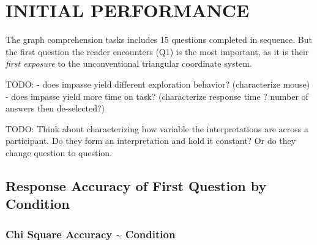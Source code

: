 \documentclass[
  letterpaper,
  DIV=11,
  numbers=noendperiod]{scrreprt}
\begin{document}
\hypertarget{initial-performance}{%
\section{INITIAL PERFORMANCE}\label{initial-performance}}

The graph comprehension tasks includes 15 questions completed in
sequence. But the first question the reader encounters (Q1) is the most
important, as it is their \emph{first exposure} to the unconventional
triangular coordinate system.

TODO: - does impasse yield different exploration behavior? (characterize
mouse) - does impasse yield more time on task? (characterize response
time ? number of answers then de-selected?)

TODO: Think about characterizing how variable the interpretations are
across a participant. Do they form an interpretation and hold it
constant? Or do they change question to question.

\hypertarget{response-accuracy-of-first-question-by-condition}{%
\subsection{Response Accuracy of First Question by
Condition}\label{response-accuracy-of-first-question-by-condition}}

\hypertarget{chi-square-accuracy-condition}{%
\subsubsection{Chi Square \textbar{} Accuracy \textasciitilde{}
Condition}\label{chi-square-accuracy-condition}}
\end{document}
